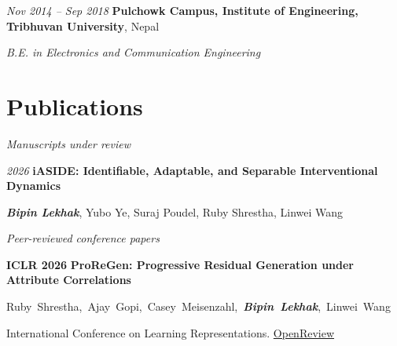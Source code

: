 \documentclass[10pt, letterpaper]{article}
\begin{document}
    \vspace{0.2 cm}

    \begin{twocolentry}{
        \textit{Nov 2014 – Sep 2018}}
        \textbf{Pulchowk Campus, Institute of Engineering, Tribhuvan University}, Nepal

        \textit{B.E. in Electronics and Communication Engineering}
    \end{twocolentry}


    \section{Publications}

    \begin{onecolentry}
        \textit{Manuscripts under review}
    \end{onecolentry}

    \vspace{0.10 cm}

    \begin{samepage}
        \begin{twocolentry}{
            \textit{2026}
            }
            \textbf{iASIDE: Identifiable, Adaptable, and Separable Interventional Dynamics}

            \vspace{0.05 cm}

            \textbf{\textit{Bipin Lekhak}}, Yubo Ye, Suraj Poudel, Ruby Shrestha, Linwei Wang
        \end{twocolentry}
    \end{samepage}

    \vspace{0.3 cm}

    \begin{onecolentry}
        \textit{Peer-reviewed conference papers}
    \end{onecolentry}

    \vspace{0.10 cm}

    \begin{samepage}
        \begin{twocolentry}{
            \textbf{ICLR 2026}
            }
            \textbf{ProReGen: Progressive Residual Generation under Attribute Correlations}

            \vspace{0.05 cm}

            \mbox{Ruby Shrestha, Ajay Gopi, Casey Meisenzahl, \textbf{\textit{Bipin Lekhak}}, Linwei Wang}

            \vspace{0.05 cm}

            International Conference on Learning Representations.
            \href{https://openreview.net/forum?id=2LzYaW032Q}{OpenReview}
        \end{twocolentry}
    \end{samepage}
\end{document}
